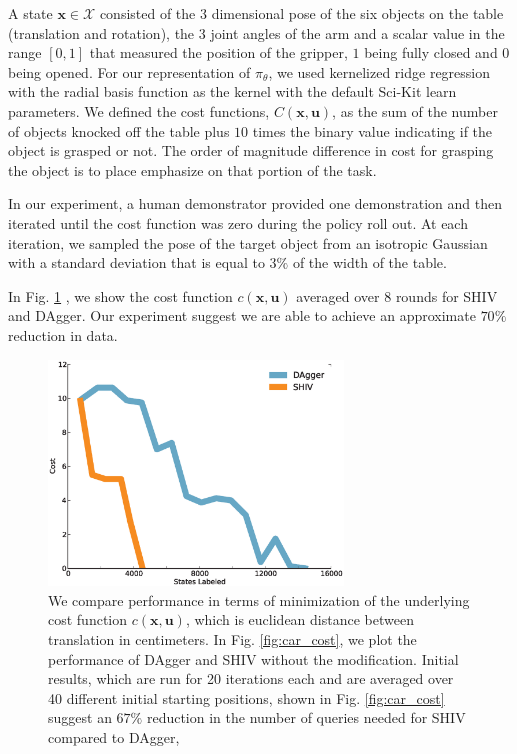 \documentclass[10pt, conference]{ieeeconf}      %
\newcommand{\bu}{\mathbf{u}}
\newcommand{\bx}{\mathbf{x}}
\begin{document}
A state $\bx\in \mathcal{X}$ consisted of the 3 dimensional pose of the six objects on the table (translation and rotation), the 3 joint angles of the arm and a scalar value in the range $[0,1]$ that measured the position of the gripper, $1$ being fully closed and $0$ being opened. For our representation of $\pi_{\theta}$, we used kernelized ridge regression with the radial basis function as the kernel with the default Sci-Kit learn parameters. We defined the cost functions, $C(\bx,\bu)$, as the sum of the number of objects knocked off the table plus $10$ times the binary value indicating if the object is grasped or not. The order of magnitude difference in cost for grasping the object is to place emphasize on that portion of the task.  

In our experiment, a human demonstrator provided one demonstration and then iterated until the cost function was zero during the policy roll out. At each iteration, we sampled the pose of the target object from an isotropic Gaussian with a standard deviation that is equal to $3\%$ of the width of the table. 

In Fig. \ref{fig:grasp_cost} , we show the cost function $c(\bx,\bu)$ averaged over 8 rounds for SHIV and DAgger.
Our experiment suggest we are able to achieve an approximate $70\%$ reduction in data. 

\begin{figure}[t!]
\centering
\includegraphics[width=\columnwidth, height=6cm]{figures/grasp_clutter.eps}
\caption{We compare performance in terms of minimization of the underlying cost function $c(\bx,\bu)$, which is euclidean distance between translation in centimeters. In Fig. \ref{fig:car_cost}, we plot the performance of DAgger and SHIV without the modification.  Initial results, which are run for 20 iterations each and are averaged over 40 different initial starting positions, shown in Fig. \ref{fig:car_cost} suggest an $67\%$ reduction in the number of queries needed for SHIV compared to DAgger,}
\vspace*{-10pt}
\label{fig:grasp_cost}
\end{figure}
\end{document}
